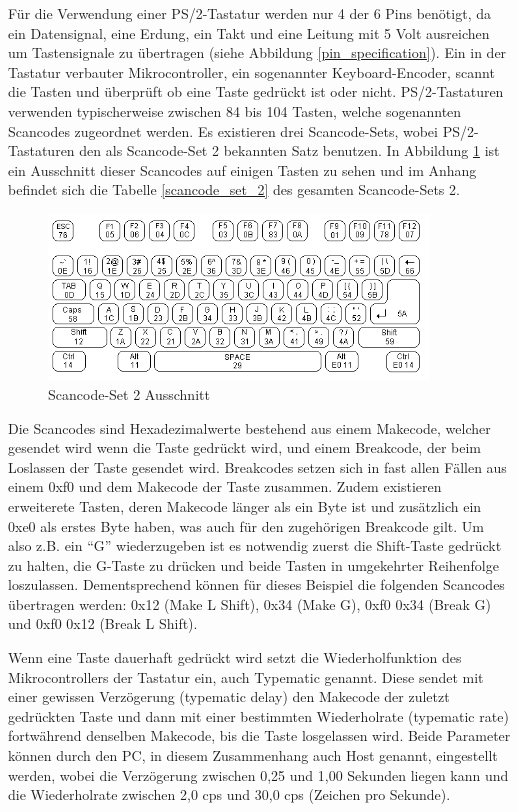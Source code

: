 Für die Verwendung einer PS/2-Tastatur werden nur 4 der 6 Pins benötigt, da ein Datensignal, eine Erdung, ein Takt und eine Leitung mit 5 Volt ausreichen um Tastensignale zu übertragen (siehe Abbildung \ref{pin_specification}). Ein in der Tastatur verbauter Mikrocontroller, ein sogenannter Keyboard-Encoder, scannt die Tasten und überprüft ob eine Taste gedrückt ist oder nicht. PS/2-Tastaturen verwenden typischerweise zwischen 84 bis 104 Tasten, welche sogenannten Scancodes zugeordnet werden. Es existieren drei Scancode-Sets, wobei PS/2-Tastaturen den als Scancode-Set 2 bekannten Satz benutzen. In Abbildung \ref{scancodes} \cite{scancodes} ist ein Ausschnitt dieser Scancodes auf einigen Tasten zu sehen und im Anhang befindet sich die Tabelle \ref{scancode_set_2} des gesamten Scancode-Sets 2.

\begin{figure}
  \centering
  \includegraphics[width=0.9\textwidth]{images/scancodes.jpg}
  \caption{Scancode-Set 2 Ausschnitt}
  \label{scancodes}
\end{figure}

Die Scancodes sind Hexadezimalwerte bestehend aus einem Makecode, welcher gesendet wird wenn die Taste gedrückt wird, und einem Breakcode, der beim Loslassen der Taste gesendet wird. Breakcodes setzen sich in fast allen Fällen aus einem 0xf0 und dem Makecode der Taste zusammen. Zudem existieren erweiterete Tasten, deren Makecode länger als ein Byte ist und zusätzlich ein 0xe0 als erstes Byte haben, was auch für den zugehörigen Breakcode gilt. Um also z.B. ein ``G'' wiederzugeben ist es notwendig zuerst die Shift-Taste gedrückt zu halten, die G-Taste zu drücken und beide Tasten in umgekehrter Reihenfolge loszulassen. Dementsprechend können für dieses Beispiel die folgenden Scancodes übertragen werden: 0x12 (Make L Shift), 0x34 (Make G), 0xf0 0x34 (Break G) und 0xf0 0x12 (Break L Shift).

Wenn eine Taste dauerhaft gedrückt wird setzt die Wiederholfunktion des Mikrocontrollers der Tastatur ein, auch Typematic genannt. Diese sendet mit einer gewissen Verzögerung (typematic delay) den Makecode der zuletzt gedrückten Taste und dann mit einer bestimmten Wiederholrate (typematic rate) fortwährend denselben Makecode, bis die Taste losgelassen wird. Beide Parameter können durch den PC, in diesem Zusammenhang auch Host genannt, eingestellt werden, wobei die Verzögerung zwischen 0,25 und 1,00 Sekunden liegen kann und die Wiederholrate zwischen 2,0 cps und 30,0 cps (Zeichen pro Sekunde).

